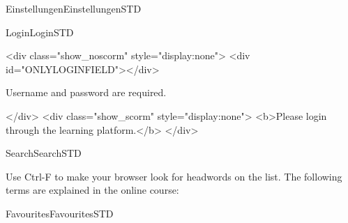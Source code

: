 \begin{MXContent}{Einstellungen}{Einstellungen}{STD}
\begin{MXContent}{Login}{Login}{STD}
\MGlobalLoginTag
{}
\begin{html}
<div class="show_noscorm" style="display:none">
<div id="ONLYLOGINFIELD"></div>
\end{html}

Username and password are required.

\begin{html}
</div>
<div class="show_scorm" style="display:none">
<b>Please login through the learning platform.</b>
</div>
\end{html}

\end{MXContent}


% 
% 
% 


\end{MXContent}



\begin{MXContent}{Search}{Search}{STD}
\MGlobalSearchTag

Use Ctrl-F to make your browser look for headwords on the list. The following terms are explained in the online course:


\end{MXContent}

\begin{MXContent}{Favourites}{Favourites}{STD}
\MGlobalFavoTag
{}


\end{MXContent}

\fi
